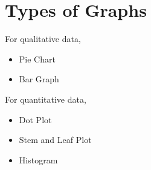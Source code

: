 \documentclass{article}
\begin{document}
    \section*{Types of Graphs}
    For qualitative data, 
    \begin{itemize}
        \item Pie Chart
        \item Bar Graph
    \end{itemize}

    For quantitative data, 
    \begin{itemize}
        \item Dot Plot
        \item Stem and Leaf Plot
        \item Histogram
    \end{itemize}
\end{document}
